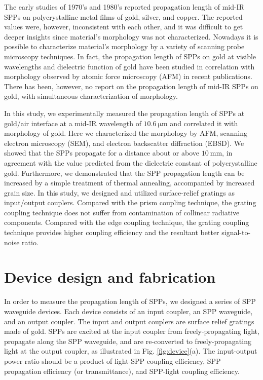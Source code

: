 \documentclass[aip,apl,reprint]{revtex4-1}
\begin{document}
The early studies of 1970's and 1980's reported propagation length of mid-IR SPPs on polycrystalline metal films of gold,\cite{McMullen, Schlesinger1, Schlesinger2} silver,\cite{Schlesinger1, Schlesinger2} and copper.\cite{Schoenwald, Shiba} The reported values were, however, inconsistent with each other, and it was difficult to get deeper insights since material's morphology was not characterized. Nowadays it is possible to characterize material's morphology by a variety of scanning probe microscopy techniques. In fact, the propagation length of SPPs on gold at visible wavelengths\cite{Kuttge} and dielectric function of gold\cite{Trollmann, Olmon} have been studied in correlation with morphology observed by atomic force microscopy (AFM) in recent publications. There has been, however, no report on the propagation length of mid-IR SPPs on gold, with simultaneous characterization of morphology.

In this study, we experimentally measured the propagation length of SPPs at gold/air interface at a mid-IR wavelength of $10.6\:\mathrm{\mu m}$ and correlated it with morphology of gold. Here we characterized the morphology by AFM, scanning electron microscopy (SEM), and electron backscatter diffraction (EBSD). We showed that the SPPs propagate for a distance about or above $10\:\mathrm{mm}$, in agreement with the value predicted from the dielectric constant of polycrystalline gold. Furthermore, we demonstrated that the SPP propagation length can be increased by a simple treatment of thermal annealing, accompanied by increased grain size.
In this study, we designed and utilized surface-relief gratings as input/output couplers. Compared with the prism coupling technique,\cite{Schoenwald, Shiba} the grating coupling technique does not suffer from contamination of collinear radiative components.\cite{Schlesinger1, Schlesinger2} Compared with the edge coupling technique,\cite{Schlesinger1, Schlesinger2} the grating coupling technique provides higher coupling efficiency and the resultant better signal-to-noise ratio. 

\section{Device design and fabrication}
\label{sec:device}
In order to measure the propagation length of SPPs, we designed a series of SPP waveguide devices. Each device consists of an input coupler, an SPP waveguide, and an output coupler.  The input and output couplers are surface relief gratings made of gold. SPPs are  excited at the input coupler from freely-propagating light, propagate along the SPP waveguide, and are re-converted to freely-propagating light at the output coupler, as illustrated in Fig. \ref{fig:device}(a). The input-output power ratio should be a product of light-SPP coupling efficiency, SPP propagation efficiency (or transmittance), and SPP-light coupling efficiency. 
\end{document}
